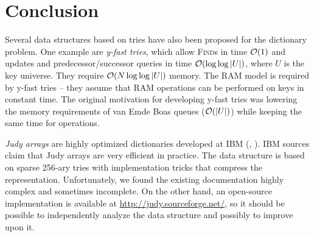 \chapter*{Conclusion}

Several data structures based on tries have also been proposed for the
dictionary problem. One example are \emph{y-fast tries}, which allow
\textsc{Find}s in time $\mathcal{O}(1)$ and updates and predecessor/successor queries
in time $\mathcal{O}(\log\log |U|)$, where $U$ is the key universe. They require
$\mathcal{O}(N \log\log |U|)$ memory.
The RAM model is required by y-fast tries -- they assume that RAM operations
can be performed on keys in constant time.
The original motivation for developing y-fast tries was lowering the memory
requirements of van Emde Boas queues ($\mathcal{O}(|U|)$) while keeping the same time
for operations.

\emph{Judy arrays} are highly optimized dictionaries developed at IBM
(\cite{judy-shop-manual}, \cite{judy-patent}).
IBM sources claim that Judy arrays are very efficient in practice.
The data structure is based on sparse 256-ary tries with implementation tricks
that compress the representation.
Unfortunately, we found the existing documentation highly complex and sometimes
incomplete. On the other hand, an open-source implementation is available
at \url{http://judy.sourceforge.net/}, so it should be possible to independently
analyze the data structure and possibly to improve upon it.
